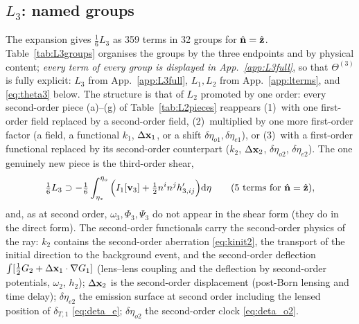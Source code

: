 \subsection{\texorpdfstring{$L_3$}{L3}: named groups}
\label{sec:L3}
The expansion gives $\tfrac16L_3$ as 359 terms in 32 groups for $\hat{\mathbf n}=\hat{\mathbf z}$.  Table~\ref{tab:L3groups} organises the groups by
the three endpoints and by physical content; \emph{every term of every group is displayed in App.~\ref{app:L3full}}, so that $\Theta^{(3)}$ is
fully explicit: $L_3$ from App.~\ref{app:L3full}, $L_1,L_2$ from App.~\ref{app:lterms}, and \eqref{eq:theta3} below.
The structure is that of $L_2$ promoted by one order: every second-order piece (a)--(g) of Table~\ref{tab:L2pieces} reappears
(1)~with one first-order field replaced by a second-order field, (2)~multiplied by one more first-order factor (a field, a
functional $k_1$, $\Delta\mathbf x_1$, or a shift $\delta\eta_{o1},\delta\eta_{e1}$), or (3)~with a first-order functional replaced by its
second-order counterpart ($k_2$, $\Delta\mathbf x_2$, $\delta\eta_{o2}$, $\delta\eta_{e2}$).  The one genuinely new piece is the third-order shear,
\begin{equation}
\tfrac16L_3\supset-\tfrac16\int_{\eta_*}^{\bar\eta_o}\Big(I_1[\mathbf v_3]+\tfrac12n^in^jh'_{3,ij}\Big)\mathrm d\eta
\qquad(\text{5 terms for }\hat{\mathbf n}=\hat{\mathbf z}),
\label{eq:L3loc3}
\end{equation}
and, as at second order, $\omega_3,\Phi_3,\Psi_3$ do not appear in the shear form (they do in the direct form).
The second-order functionals carry the second-order physics of the ray: $k_2$ contains the second-order aberration
\eqref{eq:kinit2}, the transport of the initial direction to the background event, and the second-order deflection
$\int[\tfrac12G_2+\Delta\mathbf x_1\cdot\nabla G_1]$ (lens--lens coupling and the deflection by second-order potentials, $\omega_2$, $h_2$);
$\Delta\mathbf x_2$ is the second-order displacement (post-Born lensing and time delay); $\delta\eta_{e2}$ the emission surface at second
order including the lensed position of $\delta_{T,1}$ \eqref{eq:deta_e}; $\delta\eta_{o2}$ the second-order clock \eqref{eq:deta_o2}.

